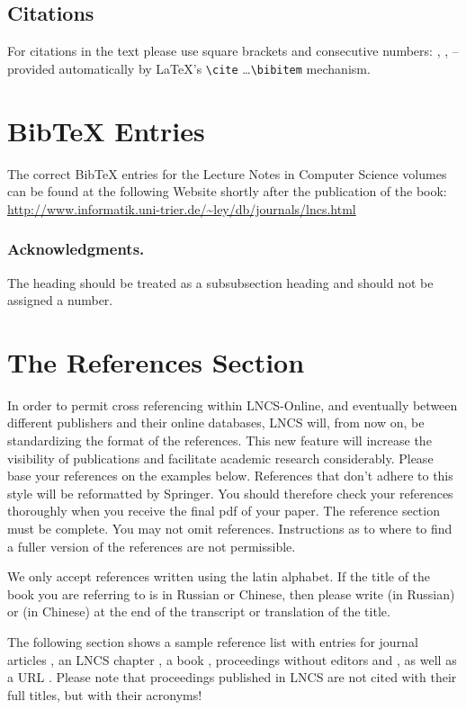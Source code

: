 \documentclass[runningheads,a4paper]{llncs}
\begin{document}
\subsection{Citations}

For citations in the text please use
square brackets and consecutive numbers: \cite{jour}, \cite{lncschap},
\cite{proceeding1} -- provided automatically
by \LaTeX 's \verb|\cite| \dots\verb|\bibitem| mechanism.

\section{BibTeX Entries}

The correct BibTeX entries for the Lecture Notes in Computer Science
volumes can be found at the following Website shortly after the
publication of the book:
\url{http://www.informatik.uni-trier.de/~ley/db/journals/lncs.html}

\subsubsection*{Acknowledgments.} The heading should be treated as a
subsubsection heading and should not be assigned a number.

\section{The References Section}\label{references}

In order to permit cross referencing within LNCS-Online, and eventually
between different publishers and their online databases, LNCS will,
from now on, be standardizing the format of the references. This new
feature will increase the visibility of publications and facilitate
academic research considerably. Please base your references on the
examples below. References that don't adhere to this style will be
reformatted by Springer. You should therefore check your references
thoroughly when you receive the final pdf of your paper.
The reference section must be complete. You may not omit references.
Instructions as to where to find a fuller version of the references are
not permissible.

We only accept references written using the latin alphabet. If the title
of the book you are referring to is in Russian or Chinese, then please write
(in Russian) or (in Chinese) at the end of the transcript or translation
of the title.

The following section shows a sample reference list with entries for
journal articles \cite{jour}, an LNCS chapter \cite{lncschap}, a book
\cite{book}, proceedings without editors \cite{proceeding1} and
\cite{proceeding2}, as well as a URL \cite{url}.
Please note that proceedings published in LNCS are not cited with their
full titles, but with their acronyms!
\end{document}
